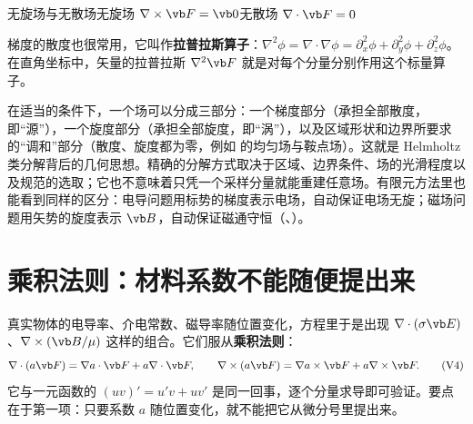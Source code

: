 \begin{compare}{无旋场与无散场}{无旋场 $\nabla\times\vb F=\vb 0$}{无散场 $\nabla\cdot\vb F=0$}
\end{compare}

梯度的散度也很常用，它叫作\textbf{拉普拉斯算子}：$\nabla^2\phi=\nabla\cdot\nabla\phi=\partial_x^2\phi+\partial_y^2\phi+\partial_z^2\phi$。在直角坐标中，矢量的拉普拉斯 $\nabla^2\vb F$ 就是对每个分量分别作用这个标量算子。

\begin{deeper}
在适当的条件下，一个场可以分成三部分：一个梯度部分（承担全部散度，即“源”），一个旋度部分（承担全部旋度，即“涡”），以及区域形状和边界所要求的“调和”部分（散度、旋度都为零，例如 的均匀场与鞍点场）。这就是 Helmholtz 类分解背后的几何思想。精确的分解方式取决于区域、边界条件、场的光滑程度以及规范的选取；它也不意味着只凭一个采样分量就能重建任意场。有限元方法里也能看到同样的区分：电导问题用标势的梯度表示电场，自动保证电场无旋；磁场问题用矢势的旋度表示 $\vb B$，自动保证磁通守恒（、）。
\end{deeper}

\section{乘积法则：材料系数不能随便提出来}\label{sec:calc-product}

真实物体的电导率、介电常数、磁导率随位置变化，方程里于是出现 $\nabla\cdot(\sigma\vb E)$、$\nabla\times(\vb B/\mu)$ 这样的组合。它们服从\textbf{乘积法则}：
\begin{equation}
\nabla\cdot(a\vb F)=\nabla a\cdot\vb F+a\nabla\cdot\vb F,
\qquad
\nabla\times(a\vb F)=\nabla a\times\vb F+a\nabla\times\vb F.
\tag{V4}\label{id:product}
\end{equation}
它与一元函数的 $(uv)'=u'v+uv'$ 是同一回事，逐个分量求导即可验证。要点在于第一项：只要系数 $a$ 随位置变化，就不能把它从微分号里提出来。

